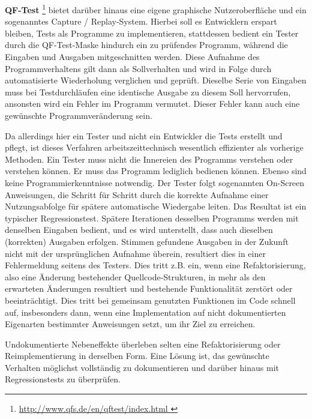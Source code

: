 \vspace{0.5cm}

\textbf{QF-Test} \footnote{\url{ http://www.qfs.de/en/qftest/index.html }} 
bietet darüber hinaus eine eigene graphische Nutzeroberfläche
und ein sogenanntes \glqq{}Capture / Replay\grqq{}-System. Hierbei soll es Entwicklern erspart bleiben,
Tests als Programme zu implementieren, stattdessen bedient ein Tester durch die QF-Test-Maske
hindurch ein zu prüfendes Programm, während die Eingaben und Ausgaben mitgeschnitten werden.
Diese Aufnahme des Programmverhaltens gilt dann als \glqq{}Sollverhalten\grqq{} und wird in Folge
durch automatisierte Wiederholung verglichen und geprüft. Dieselbe Serie von Eingaben muss
bei Testdurchläufen eine identische Ausgabe zu diesem Soll hervorrufen, ansonsten
wird ein Fehler im Programm vermutet. Dieser Fehler kann auch eine gewünschte Programmveränderung sein.

Da allerdings hier ein Tester und nicht ein Entwickler die Tests erstellt und pflegt, ist dieses
Verfahren arbeitszeittechnisch wesentlich effizienter als vorherige Methoden. Ein Tester muss
nicht die Innereien des Programms verstehen oder verstehen können. Er muss das Programm lediglich
bedienen können. Ebenso sind keine Programmierkenntnisse notwendig. Der Tester folgt sogenannten
\glqq{}On-Screen\grqq{} Anweisungen, die Schritt für Schritt durch die korrekte Aufnahme einer
Nutzungsabfolge für spätere automatische Wiedergabe leiten. Das Resultat ist ein typischer
Regressionstest. Spätere Iterationen desselben Programms werden mit denselben Eingaben
bedient, und es wird unterstellt, dass auch dieselben (korrekten) Ausgaben erfolgen.
Stimmen gefundene Ausgaben in der Zukunft nicht mit der ursprünglichen Aufnahme überein, resultiert
dies in einer Fehlermeldung seitens des Testers. Dies tritt z.B. ein, wenn eine Refaktorisierung,
also eine Änderung bestehender Quellcode-Strukturen, in mehr als den erwarteten Änderungen
resultiert und bestehende Funktionalität zerstört oder beeinträchtigt. Dies tritt bei
gemeinsam genutzten Funktionen im Code schnell auf, insbesonders dann, wenn eine Implementation 
auf nicht dokumentierten Eigenarten bestimmter Anweisungen setzt, um ihr Ziel zu erreichen.

Undokumentierte Nebeneffekte überleben selten eine Refaktorisierung oder Reimplementierung
in derselben Form. Eine Lösung ist, das gewünschte Verhalten möglichst vollständig zu dokumentieren
und darüber hinaus mit Regressionstests zu überprüfen.



